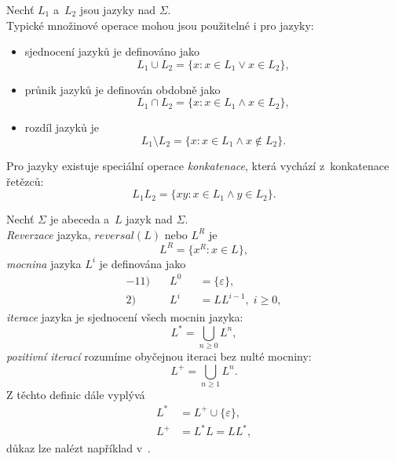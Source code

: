\begin{definition}
    Nechť $L_1$ a~$L_2$ jsou jazyky nad $\Sigma$.\\
    Typické množinové operace mohou jsou použitelné i pro jazyky:
    \begin{itemize}
        \item sjednocení jazyků je definováno jako 
        \begin{equation*}
            L_1 \cup L_2 = \{x : x \in L_1 \vee x \in L_2\},
        \end{equation*}
        \item průnik jazyků je definován obdobně jako
        \begin{equation*}
            L_1 \cap L_2 = \{x : x \in L_1 \wedge x \in L_2\},
        \end{equation*}
        \item rozdíl jazyků je
        \begin{equation*}
            L_1 \setminus L_2 = \{x : x \in L_1 \wedge x \notin L_2\}.
        \end{equation*} 
    \end{itemize}
    Pro jazyky existuje speciální operace \emph{konkatenace}, která vychází z~konkatenace řetězců:
    \begin{equation*}
        L_1L_2 = \{xy : x \in L_1 \wedge y \in L_2\}.   
    \end{equation*} 
\end{definition}

\begin{definition}
    Nechť $\Sigma$ je abeceda a~$L$ jazyk nad $\Sigma$.\\
    \emph{Reverzace} jazyka, $reversal(L)$ nebo $L^R$ je
    \begin{equation*}
        L^R = \{x^R : x \in L\},
    \end{equation*}
    \emph{mocnina} jazyka $L^i$ je definována jako
    \begin{alignat*}{-1}
        \text{1)}& \quad L^0 &&= \{\varepsilon\},\\
        \text{2)}& \quad L^i &&= LL^{i-1},\; i \geq 0,
    \end{alignat*}
    \emph{iterace} jazyka je sjednocení všech mocnin jazyka:
    \begin{equation*}
        L^* = \bigcup_{n \geq 0} L^n,
    \end{equation*}
    \emph{pozitivní iterací} rozumíme obyčejnou iteraci bez nulté mocniny:
    \begin{equation*}
        L^+ = \bigcup_{n \geq 1} L^n.
    \end{equation*}
    Z těchto definic dále vyplývá 
    \begin{align*}
        L^* &= L^+ \cup \{\varepsilon\},\\
        L^+ &= L^*L = LL^*,
    \end{align*}
    důkaz lze nalézt například v~\cite{TIN-opora}.
\end{definition}

